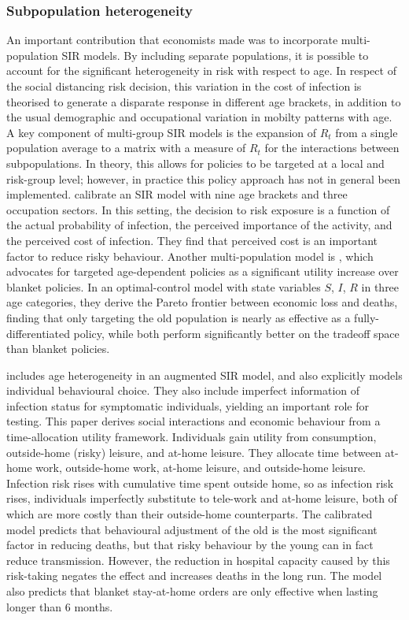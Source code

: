 \documentclass{article}
\begin{document}
\subsubsection{Subpopulation heterogeneity}
An important contribution that economists made was to incorporate multi-population SIR models. By including separate populations, it is possible to account for the significant heterogeneity in risk with respect to age. In respect of the social distancing risk decision, this variation in the cost of infection is theorised to generate a disparate response in different age brackets, in addition to the usual demographic and occupational variation in mobilty patterns with age. A key component of multi-group SIR models is the expansion of \(R_t\) from a single population average to a matrix with a measure of \(R_t\) for the interactions between subpopulations. In theory, this allows for policies to be targeted at a local and risk-group level; however, in practice this policy approach has not in general been implemented. \textcite{faveroRestartingEconomySaving2020} calibrate an SIR model with nine age brackets and three occupation sectors. In this setting, the decision to risk exposure is a function of the actual probability of infection, the perceived importance of the activity, and the perceived cost of infection. They find that perceived cost is an important factor to reduce risky behaviour. Another multi-population model is \textcite{acemogluOptimalTargetedLockdowns2020}, which advocates for targeted age-dependent policies as a significant utility increase over blanket policies. In an optimal-control model with state variables \(S\), \(I\), \(R\) in three age categories, they derive the Pareto frontier between economic loss and deaths, finding that only targeting the old population is nearly as effective as a fully-differentiated policy, while both perform significantly better on the tradeoff space than blanket policies. 

\textcite{brotherhoodEconomicModelCOVID192020} includes age heterogeneity in an augmented SIR model, and also explicitly models individual behavioural choice. They also include imperfect information of infection status for symptomatic individuals, yielding an important role for testing. This paper derives social interactions and economic behaviour from a time-allocation utility framework. Individuals gain utility from consumption, outside-home (risky) leisure, and at-home leisure. They allocate time between at-home work, outside-home work, at-home leisure, and outside-home leisure. Infection risk rises with cumulative time spent outside home, so as infection risk rises, individuals imperfectly substitute to tele-work and at-home leisure, both of which are more costly than their outside-home counterparts. The calibrated model predicts that behavioural adjustment of the old is the most significant factor in reducing deaths, but that risky behaviour by the young can in fact reduce transmission. However, the reduction in hospital capacity caused by this risk-taking negates the effect and increases deaths in the long run. The model also predicts that blanket stay-at-home orders are only effective when lasting longer than 6 months.
\end{document}

